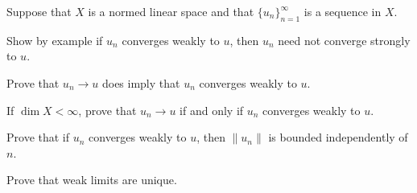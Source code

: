 Suppose that $X$ is a normed linear space and that
$\{u_n\}_{n=1}^{\infty}$ is a sequence in $X$.
\begin{alist}
\item Show by example if $u_n$ converges weakly to $u$, then $u_n$
need not converge strongly to $u$.
\item Prove that $u_n\rightarrow u$ does imply that $u_n$ converges
weakly to $u$.
\item If $\dim X<\infty$, prove that $u_n\rightarrow u$ if and only if
$u_n$ converges weakly to $u$.
\item Prove that if $u_n$ converges weakly to $u$, then $\|u_n\|$ is
bounded independently of $n$.
\item Prove that weak limits are unique.
\end{alist}
